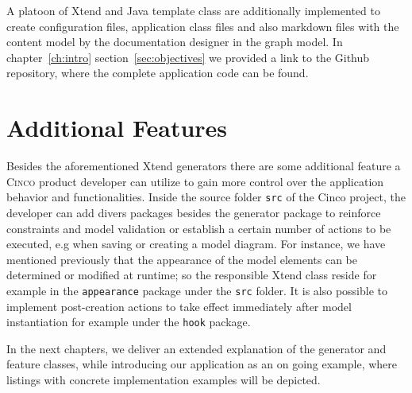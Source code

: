 A platoon of Xtend and Java template class are additionally implemented to create configuration files, application class files and also markdown files with the content model by the documentation designer in the graph model. In chapter~\ref{ch:intro} section~\ref{sec:objectives} we provided a link to the Github repository, where the complete application code can be found.

\section{Additional Features}

Besides the aforementioned Xtend generators there are some additional feature a \textsc{Cinco} product developer can utilize to gain more control over the application behavior and functionalities. Inside the source folder \lstinline{src} of the Cinco project, the developer can add divers packages besides the generator package to reinforce constraints and model validation or establish a certain number of actions to be executed, e.g when saving or creating a model diagram. For instance, we have mentioned previously that the appearance of the model elements can be determined or modified at runtime; so the responsible Xtend class reside for example in the \lstinline{appearance} package under the \lstinline{src} folder. It is also possible to implement post-creation actions to take effect immediately after model instantiation for example under the \lstinline{hook} package.  

In the next chapters, we deliver an extended explanation of the generator and feature classes, while introducing our application as an on going example, where listings with concrete implementation examples will be depicted.